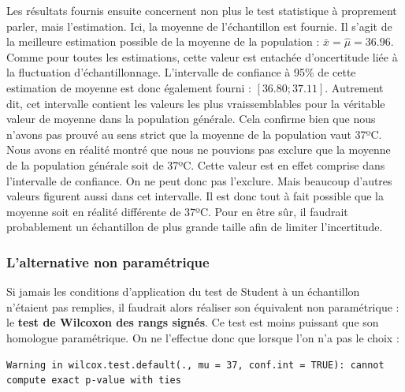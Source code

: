 \documentclass[a4paperpaper,]{article}
\newenvironment{Shaded}{\begin{snugshade}}{\end{snugshade}}
\newcommand{\DataTypeTok}[1]{\textcolor[rgb]{0.00,0.34,0.68}{#1}}
\newcommand{\DecValTok}[1]{\textcolor[rgb]{0.69,0.50,0.00}{#1}}
\newcommand{\KeywordTok}[1]{\textcolor[rgb]{0.12,0.11,0.11}{\textbf{#1}}}
\newcommand{\NormalTok}[1]{\textcolor[rgb]{0.12,0.11,0.11}{#1}}
\newcommand{\OperatorTok}[1]{\textcolor[rgb]{0.12,0.11,0.11}{#1}}
\newcommand{\OtherTok}[1]{\textcolor[rgb]{0.00,0.43,0.16}{#1}}
\newcommand{\StringTok}[1]{\textcolor[rgb]{0.75,0.01,0.01}{#1}}
\begin{document}
Les résultats fournis ensuite concernent non plus le test statistique à proprement parler, mais l'estimation. Ici, la moyenne de l'échantillon est fournie. Il s'agit de la meilleure estimation possible de la moyenne de la population : \(\bar{x} = \hat{\mu} = 36.96\). Comme pour toutes les estimations, cette valeur est entachée d'oncertitude liée à la fluctuation d'échantillonnage. L'intervalle de confiance à 95\% de cette estimation de moyenne est donc également fourni : \([36.80 ; 37.11]\). Autrement dit, cet intervalle contient les valeurs les plus vraissemblables pour la véritable valeur de moyenne dans la population générale. Cela confirme bien que nous n'avons pas prouvé au sens strict que la moyenne de la population vaut 37ºC. Nous avons en réalité montré que nous ne pouvions pas exclure que la moyenne de la population générale soit de 37ºC. Cette valeur est en effet comprise dans l'intervalle de confiance. On ne peut donc pas l'exclure. Mais beaucoup d'autres valeurs figurent aussi dans cet intervalle. Il est donc tout à fait possible que la moyenne soit en réalité différente de 37ºC. Pour en être sûr, il faudrait probablement un échantillon de plus grande taille afin de limiter l'incertitude.

\hypertarget{lalternative-non-parametrique}{%
\subsubsection{L'alternative non paramétrique}\label{lalternative-non-parametrique}}

Si jamais les conditions d'application du test de Student à un échantillon n'étaient pas remplies, il faudrait alors réaliser son équivalent non paramétrique : le \textbf{test de Wilcoxon des rangs signés}. Ce test est moins puissant que son homologue paramétrique. On ne l'effectue donc que lorsque l'on n'a pas le choix :

\begin{Shaded}
\end{Shaded}

\begin{verbatim}
Warning in wilcox.test.default(., mu = 37, conf.int = TRUE): cannot
compute exact p-value with ties
\end{verbatim}
\end{document}
